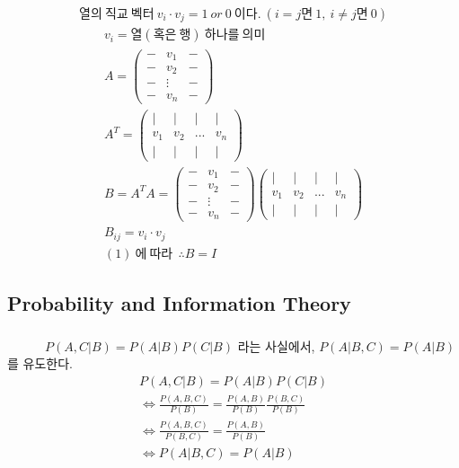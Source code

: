 \documentclass[a4paper]{article}
\begin{document}
\subsubsection{} %
\begin{gather}
    열의~직교~벡터 ~v_i \cdot v_j = 1~or~0~이다.~(i=j 면~1,~ i \neq j 면~0)
\end{gather}
\begin{gather*}
    v_i = 열(혹은~행)~하나를~의미 \\ 
    A = \begin{pmatrix}
    - & v_1 & -\\
    - & v_2 & -\\
    - & \vdots & -\\
    - & v_n & -
    \end{pmatrix} \\ 
    A^{T} =\begin{pmatrix}
    \mid  & \mid  & \mid  & \mid  \\
    v_1 & v_2 &... &v_n \\
    \mid  & \mid  & \mid  & \mid 
    \end{pmatrix} \\
    B = A^{T}A = \begin{pmatrix}
    - & v_1 & -\\
    - & v_2 & -\\
    - & \vdots & -\\
    - & v_n & -
    \end{pmatrix}
    \begin{pmatrix}
    \mid  & \mid  & \mid  & \mid  \\
    v_1 & v_2 &... &v_n \\
    \mid  & \mid  & \mid  & \mid 
    \end{pmatrix} \\ 
    B_{ij} = v_i \cdot v_j \\
    (1)~에~따라~~\therefore B = I
\end{gather*}


\subsection{Probability and Information Theory}
\subsubsection{} %
~~~~~~$P(A, C | B) = P(A | B)P(C|B)$ 라는 사실에서, $P(A|B,C) = P(A|B)$ 를 유도한다.
~~~~~~\begin{gather*}
P(A, C | B) = P(A | B)P(C|B) \\
\Leftrightarrow \frac{P(A, B, C)}{P(B)} = \frac{P(A, B)}{P(B)} \frac{P(B, C)}{P(B)} \\ 
\Leftrightarrow \frac{P(A, B, C)}{P(B, C)} = \frac{P(A, B)}{P(B)} \\
\Leftrightarrow  P(A|B,C) = P(A|B) \\
\end{gather*} 
\end{document}
